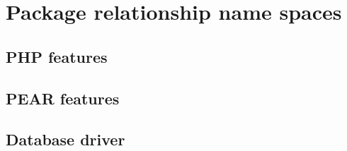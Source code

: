 \section[sec:package relationship name spaces]{Package relationship name spaces}

\subsection[sec:package relationship name spaces php features]{PHP features}


\subsection[sec:package relationship name spaces pear packages]{PEAR features}


\subsection[sec:package relationship name spaces database drivers]{Database driver}

